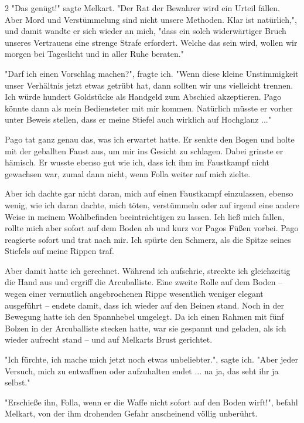 \documentclass[10pt, a4paper, oneside]{book}
\begin{document}
\begin{multicols}{2}
"Das genügt!" sagte Melkart. "Der Rat der Bewahrer wird ein Urteil fällen. Aber Mord und Verstümmelung sind nicht unsere Methoden. Klar ist natürlich,", und damit wandte er sich wieder an mich, "dass ein solch widerwärtiger Bruch unseres Vertrauens eine strenge Strafe erfordert. Welche das sein wird, wollen wir morgen bei Tageslicht und in aller Ruhe beraten."

"Darf ich einen Vorschlag machen?", fragte ich. "Wenn diese kleine Unstimmigkeit unser Verhältnis jetzt etwas getrübt hat, dann sollten wir uns vielleicht trennen. Ich würde hundert Goldstücke als Handgeld zum Abschied akzeptieren. Pago könnte dann als mein Bediensteter mit mir kommen. Natürlich müsste er vorher unter Beweis stellen, dass er meine Stiefel auch wirklich auf Hochglanz ..."

Pago tat ganz genau das, was ich erwartet hatte. Er senkte den Bogen und holte mit der geballten Faust aus, um mir ins Gesicht zu schlagen. Dabei grinste er hämisch. Er wusste ebenso gut wie ich, dass ich ihm im Faustkampf nicht gewachsen war, zumal dann nicht, wenn Folla weiter auf mich zielte.

Aber ich dachte gar nicht daran, mich auf einen Faustkampf einzulassen, ebenso wenig, wie ich daran dachte, mich töten, verstümmeln oder auf irgend eine andere Weise in meinem Wohlbefinden beeinträchtigen zu lassen. Ich ließ mich fallen, rollte mich aber sofort auf dem Boden ab und kurz vor Pagos Füßen vorbei. Pago reagierte sofort und trat nach mir. Ich spürte den Schmerz, als die Spitze seines Stiefels auf meine Rippen traf.

Aber damit hatte ich gerechnet. Während ich aufschrie, streckte ich gleichzeitig die Hand aus und ergriff die Arcuballiste. Eine zweite Rolle auf dem Boden – wegen einer vermutlich angebrochenen Rippe wesentlich weniger elegant ausgeführt – endete damit, dass ich wieder auf den Beinen stand. Noch in der Bewegung hatte ich den Spannhebel umgelegt. Da ich einen Rahmen mit fünf Bolzen in der Arcuballiste stecken hatte, war sie gespannt und geladen, als ich wieder aufrecht stand – und auf Melkarts Brust gerichtet.

"Ich fürchte, ich mache mich jetzt noch etwas unbeliebter.", sagte ich. "Aber jeder Versuch, mich zu entwaffnen oder aufzuhalten endet ... na ja, das seht ihr ja selbst."

"Erschieße ihn, Folla, wenn er die Waffe nicht sofort auf den Boden wirft!", befahl Melkart, von der ihm drohenden Gefahr anscheinend völlig unberührt.


\end{multicols}
\end{document}
